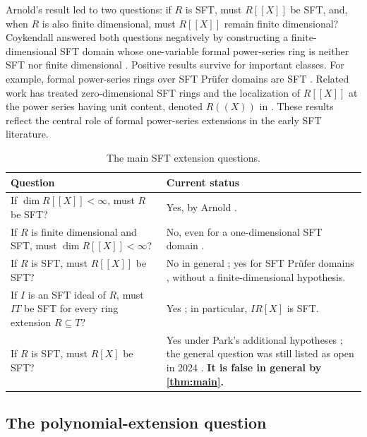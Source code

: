 \documentclass[11pt,reqno]{amsart}
\numberwithin{equation}{section}
\theoremstyle{plain}
\theoremstyle{definition}
\theoremstyle{remark}
\begin{document}
Arnold's result led to two questions: if $R$ is SFT, must
$R[[X]]$ be SFT, and, when $R$ is also finite dimensional, must $R[[X]]$
remain finite dimensional?  Coykendall answered both questions negatively
by constructing a finite-dimensional SFT domain whose one-variable formal
power-series ring is neither SFT nor finite dimensional
\cite{Coykendall2002}.  Positive results survive for important classes.  For
example, formal power-series rings over SFT Pr\"ufer domains are SFT
\cite{KangPark2007}.  Related work has treated zero-dimensional SFT rings
\cite{CondoCoykendallDobbs1996} and the localization of $R[[X]]$ at the
power series having unit content, denoted $R((X))$ in
\cite{ElaoudKang2006}.  These results reflect the central role of formal
power-series extensions in the early SFT literature.

\begin{table}[!t]
\centering
\caption{The main SFT extension questions.}
\label{tab:sft-extension-status}
\footnotesize
\setlength{\tabcolsep}{5pt}
\renewcommand{\arraystretch}{1.15}
\begin{tabular}{@{}p{}p{}@{}}
\toprule
Question & Current status \\
\midrule
If $\dim R[[X]]<\infty$, must $R$ be SFT?
  & Yes, by Arnold \cite[Theorem~1]{Arnold1973Krull}. \\ \addlinespace[0.25em]
If $R$ is finite dimensional and SFT, must $\dim R[[X]]<\infty$?
  & No, even for a one-dimensional SFT domain \cite{Coykendall2002}. \\ \addlinespace[0.25em]
If $R$ is SFT, must $R[[X]]$ be SFT?
  & No in general \cite{Coykendall2002}; yes for SFT Pr\"ufer domains
    \cite{KangPark2007}, without a finite-dimensional hypothesis. \\ \addlinespace[0.25em]
If $I$ is an SFT ideal of $R$, must $IT$ be SFT for every ring extension
$R\subseteq T$?
  & Yes \cite[Theorem~4.13]{CoykendallDutta2024}; in particular, $IR[X]$ is
    SFT. \\ \addlinespace[0.25em]
If $R$ is SFT, must $R[X]$ be SFT?
  & Yes under Park's additional hypotheses \cite{Park2019}; the general
    question was still listed as open in 2024 \cite{CoykendallDutta2024}.
    \textbf{It is false in general by \cref{thm:main}.} \\
\bottomrule
\end{tabular}
\end{table}

\subsection{The polynomial-extension question}
\end{document}
